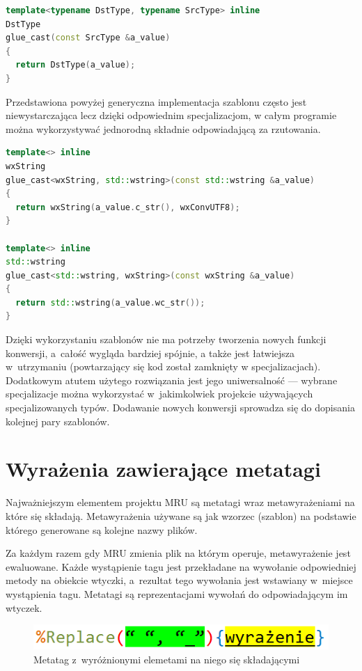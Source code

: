 \begin{lstlisting}[caption={ glue.hpp}, language=C++]
template<typename DstType, typename SrcType> inline
DstType
glue_cast(const SrcType &a_value)
{
  return DstType(a_value);
}
\end{lstlisting}

\par
Przedstawiona powyżej generyczna implementacja szablonu często jest niewystarczająca lecz dzięki odpowiednim specjalizacjom, w całym programie można wykorzystywać jednorodną składnie odpowiadającą za rzutowania.
\clearpage
\begin{lstlisting}[caption={ Fragment glue\_impl.hpp --- specjalizacja dla std::wstring i~wxString}, language=C++]
template<> inline
wxString
glue_cast<wxString, std::wstring>(const std::wstring &a_value)
{
  return wxString(a_value.c_str(), wxConvUTF8);
}

template<> inline
std::wstring
glue_cast<std::wstring, wxString>(const wxString &a_value)
{
  return std::wstring(a_value.wc_str());
}

\end{lstlisting}

\par
Dzięki wykorzystaniu szablonów nie ma potrzeby tworzenia nowych funkcji konwersji, a~całość wygląda bardziej spójnie, a także jest łatwiejsza w~utrzymaniu (powtarzający się kod został zamknięty w specjalizacjach). Dodatkowym atutem użytego rozwiązania jest jego uniwersalność --- wybrane specjalizacje można wykorzystać w~jakimkolwiek projekcie używających specjalizowanych typów. Dodawanie nowych konwersji sprowadza się do dopisania kolejnej pary szablonów.

\section{Wyrażenia zawierające metatagi}
Najważniejszym elementem projektu MRU są metatagi wraz metawyrażeniami na które się składają.
Metawyrażenia używane są jak wzorzec (szablon) na podstawie którego generowane są kolejne nazwy plików.

\par
Za każdym razem gdy MRU zmienia plik na którym operuje, metawyrażenie jest ewaluowane. Każde wystąpienie tagu jest przekładane na wywołanie odpowiedniej metody na obiekcie wtyczki, a~rezultat tego wywołania jest wstawiany w~miejsce wystąpienia tagu.
Metatagi są reprezentacjami wywołań do odpowiadającym im wtyczek.

\begin{figure}
\begin{center}
\includegraphics[scale=0.50]{img/metatag_sample.png}
\end{center}
\caption{Metatag z~wyróżnionymi elemetami na niego się składającymi}
\end{figure}

